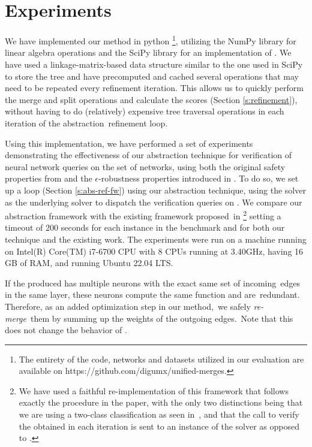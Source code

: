 \section{Experiments} 
We have implemented our method in python \footnote{The entirety of the code, networks and datasets utilized in our evaluation are available on https://github.com/digumx/unified-merges.}, utilizing the NumPy library for linear algebra operations and the SciPy library for an implementation of \hcluster. We have used a linkage-matrix-based data structure similar to the one used in SciPy to store the tree and have precomputed and cached several operations that may need to be repeated every refinement iteration. This allows us to quickly perform the merge and split operations and calculate the scores (Section \ref{s:refinement}), without having to do (relatively)
expensive tree traversal operations in each iteration of the abstraction refinement loop.

Using this implementation, we have performed a set of experiments demonstrating the effectiveness of our abstraction technique for verification of neural network queries on the \acasxu set of networks, using both the original safety properties from \cite{reluplex} and the $\epsilon$-robustness properties introduced in \cite{cegar-nn}. To do so, we set up a \cegar loop (Section \ref{s:abs-ref-fw}) using our abstraction technique, using the \neuralsat solver as the underlying solver to dispatch the verification queries on \abs. We compare our abstraction framework with the existing \cegar framework proposed in \cite{cegar-nn} \footnote{We have used a faithful re-implementation of this framework that follows exactly the procedure in the paper, with the only two distinctions being that we are using a two-class classification as seen in \cite{chauhan2022efficiently,liu2022abstraction,10.1145/3644387},
and that the call to verify the \abs obtained in each iteration is sent to an instance of the \neuralsat solver as opposed to \marabou. } setting a timeout of 200 seconds for each instance in the benchmark and for both our technique and the existing work. The experiments were run on a machine running on Intel(R) Core(TM) i7-6700 CPU with 8 CPUs running at 3.40GHz, having 16 GB of RAM, and running Ubuntu 22.04 LTS.


If the \abs produced has multiple neurons with the exact same set of incoming edges in the same layer, these neurons compute the same function and are redundant. Therefore, as an added optimization step in our method, we safely \textit{re-merge} them by summing up the weights of the outgoing edges. Note that this does not change the behavior of \abs.


